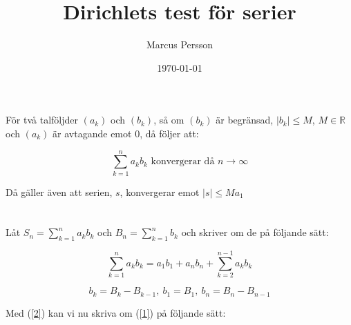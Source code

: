 \documentclass{article}
\title{Dirichlets test för serier}
\author{Marcus Persson}
\date{\today}
\begin{document}
\maketitle

\section*{}

För två talföljder $(a_k)$ och $(b_k)$, så om $(b_k)$ är begränsad, $|b_k| \leq M$, $M \in \mathbb{R}$ och $(a_k)$ är avtagande emot $0$, då följer att:

\begin{equation*}
    \sum_{k=1}^{n}a_kb_k \text{ konvergerar då } n \rightarrow \infty
\end{equation*}

\noindent Då gäller även att serien, $s$, konvergerar emot $|s|\leq Ma_1$


\section*{}

Låt $S_n=\sum_{k=1}^{n}a_k b_k$ och $B_n=\sum_{k=1}^{n}b_k$ och skriver om de på följande sätt:

\begin{equation}
\label{1}
    \sum_{k=1}^{n}a_k b_k = a_1 b_1 + a_n b_n + \sum_{k=2}^{n-1}a_k b_k
\end{equation}

\begin{equation}
\label{2}
    b_k = B_k - B_{k-1},\ b_1 = B_1,\ b_n = B_n - B_{n-1} 
\end{equation}

\noindent Med (\ref{2}) kan vi nu skriva om (\ref{1}) på följande sätt:
\end{document}
